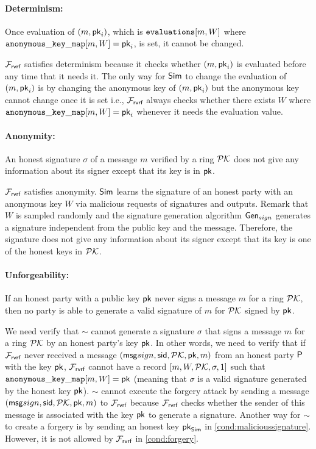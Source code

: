 \paragraph{Determinism:} Once evaluation of $ (m, \mathsf{pk}_i) $, which is $ \texttt{evaluations}[m,W] $ where $ \mathtt{anonymous\_key\_map}[m,W] = \mathsf{pk}_i $, is set, it cannot be changed. 

$ \mathcal{F}_{\textsf{rvrf}} $ satisfies determinism because it checks whether $ (m, \mathsf{pk}_i) $ is evaluated before any time that it needs it. The only way for $ \mathsf{Sim} $ to change the evaluation of $ (m, \mathsf{pk}_i) $ is by changing the anonymous key of $ (m, \mathsf{pk}_i)  $ but the anonymous key cannot change once it is set i.e., $ \mathcal{F}_{\textsf{rvrf}} $ always checks whether there exists $ W $ where $ \mathtt{anonymous\_key\_map}[m,W]  = \mathsf{pk}_i$ whenever it needs the evaluation value.

\paragraph{Anonymity:} An honest signature $ \sigma $ of a message $ m $ verified by a ring $ {\mathcal{PK}} $ does not give any information about its signer except that its key is in $ \mathsf{pk} $.

$ \mathcal{F}_{\textsf{rvrf}} $ satisfies anonymity. $ \mathsf{Sim} $ learns the signature of an honest party with an anonymous key $ W $ via malicious requests of signatures and outputs. Remark that $ W $ is sampled randomly and the signature generation algorithm $ \mathsf{Gen}_{sign} $ generates a signature independent from the public key and the message. Therefore, the signature does not give any information about its signer except that its key is one of the honest keys in  $ {\mathcal{PK}}  $.

\paragraph{Unforgeability:}  If an honest party with a public key $ \mathsf{pk} $ never signs a message $ m $ for a ring $ {\mathcal{PK}} $, then no party is able to generate a valid signature of $ m $ for $ {\mathcal{PK}} $ signed by $ \mathsf{pk} $. 

We need verify that $ \sim $ cannot generate a signature $ \sigma $ that signs a message $ m $ for a ring $ {\mathcal{PK}} $ by an honest party's key $ \mathsf{pk} $. In other words, we need to verify that if $ \mathcal{F}_{\textsf{rvrf}} $ never received a message $ (\mathsf{msg}{sign}, \textsf{sid},{\mathcal{PK}},\mathsf{pk},m) $ from an honest party $ \mathsf{P} $ with the key $ \mathsf{pk} $, $ \mathcal{F}_{\textsf{rvrf}} $ cannot have a record $ [m, W, {\mathcal{PK}}, \sigma, 1] $ such that $ \mathtt{anonymous\_key\_map}[m,W]  = \mathsf{pk}$ (meaning that $ \sigma $ is a valid signature generated by the honest key $ \mathsf{pk} $). 
$ \sim $ cannot execute the forgery attack by sending a message $ (\mathsf{msg}{sign}, \textsf{sid},{\mathcal{PK}},\mathsf{pk},m) $ to $ \mathcal{F}_{\textsf{rvrf}} $ because $ \mathcal{F}_{\textsf{rvrf}} $ checks whether the sender of this message is associated with the key $ \mathsf{pk} $ to generate a signature. Another way for $ \sim $ to create a forgery is by sending an honest key $ \mathsf{pk}_{\mathsf{Sim}} $  in \ref{cond:malicioussignature}. However, it is not allowed by $ \mathcal{F}_{\textsf{rvrf}} $ in \ref{cond:forgery}.


